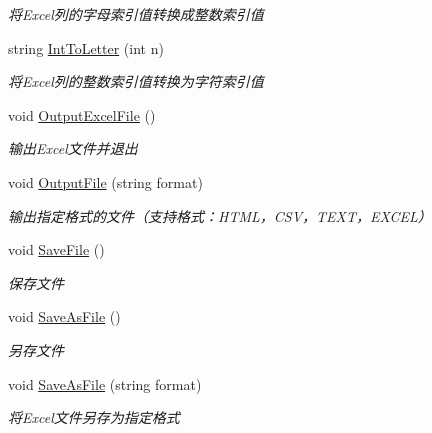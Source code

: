 \begin{DoxyCompactItemize}
\begin{DoxyCompactList}\small\item\em 将\+Excel列的字母索引值转换成整数索引值 \end{DoxyCompactList}\item 
string \hyperlink{class_x_c_l_net_tools_1_1_office_1_1_excel_handler_1_1_excel_helper_a836d286d62fb23c00f87b81fd197e006}{Int\+To\+Letter} (int n)
\begin{DoxyCompactList}\small\item\em 将\+Excel列的整数索引值转换为字符索引值 \end{DoxyCompactList}\item 
void \hyperlink{class_x_c_l_net_tools_1_1_office_1_1_excel_handler_1_1_excel_helper_a4eefc84b1fe60281333eb6e1a3e9c4eb}{Output\+Excel\+File} ()
\begin{DoxyCompactList}\small\item\em 输出\+Excel文件并退出 \end{DoxyCompactList}\item 
void \hyperlink{class_x_c_l_net_tools_1_1_office_1_1_excel_handler_1_1_excel_helper_ad562788e030ea85104763082c228fa23}{Output\+File} (string format)
\begin{DoxyCompactList}\small\item\em 输出指定格式的文件（支持格式：\+H\+T\+M\+L，\+C\+S\+V，\+T\+E\+X\+T，\+E\+X\+C\+E\+L） \end{DoxyCompactList}\item 
void \hyperlink{class_x_c_l_net_tools_1_1_office_1_1_excel_handler_1_1_excel_helper_a85e4eb3e29066ce7d82fab75fcb713ab}{Save\+File} ()
\begin{DoxyCompactList}\small\item\em 保存文件 \end{DoxyCompactList}\item 
void \hyperlink{class_x_c_l_net_tools_1_1_office_1_1_excel_handler_1_1_excel_helper_ae17970792f4828d10ae35f6f0deefcba}{Save\+As\+File} ()
\begin{DoxyCompactList}\small\item\em 另存文件 \end{DoxyCompactList}\item 
void \hyperlink{class_x_c_l_net_tools_1_1_office_1_1_excel_handler_1_1_excel_helper_a26e058e269d771b774e4419ea5df46b6}{Save\+As\+File} (string format)
\begin{DoxyCompactList}\small\item\em 将\+Excel文件另存为指定格式 \end{DoxyCompactList}\item 

\end{DoxyCompactItemize}
